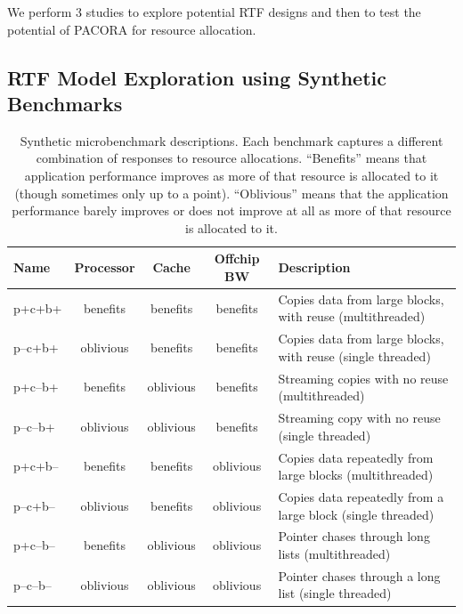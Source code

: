 We perform 3 studies to explore potential RTF designs and then to test the potential of PACORA for resource allocation.

\subsection{RTF Model Exploration using Synthetic Benchmarks}

\begin{table}[t]
\centering
\scriptsize
\begin{tabular}{|l|c|c|c|l|}
\hline
 Name  & Processor  &  Cache &  Offchip BW & Description \\ \hline
 p+c+b+ & benefits & benefits & benefits &  Copies data from large blocks, with reuse (multithreaded)\\ \hline
p--c+b+ & oblivious & benefits & benefits &  Copies data from large blocks, with reuse (single threaded)\\ \hline
p+c--b+ & benefits & oblivious & benefits &  Streaming copies with no reuse (multithreaded)\\ \hline
p--c--b+ & oblivious & oblivious & benefits &  Streaming copy with no reuse (single threaded)\\ \hline
p+c+b-- & benefits & benefits & oblivious &  Copies data repeatedly from large blocks (multithreaded)\\ \hline
p--c+b-- & oblivious & benefits & oblivious &  Copies data repeatedly from a large block (single threaded)\\ \hline
p+c--b-- & benefits & oblivious & oblivious &  Pointer chases through long lists (multithreaded)\\ \hline
p--c--b-- & oblivious & oblivious & oblivious &  Pointer chases through a long list (single threaded)\\ \hline
\end{tabular}
\caption{Synthetic microbenchmark descriptions. Each benchmark captures a different combination of responses to resource allocations.  ``Benefits'' means that application performance improves as more of that resource is allocated to it (though sometimes only up to a point).  ``Oblivious'' means that the application performance barely improves or does not improve at all as more of that resource is allocated to it.}
\label{table:benchmarks1}
\end{table}

